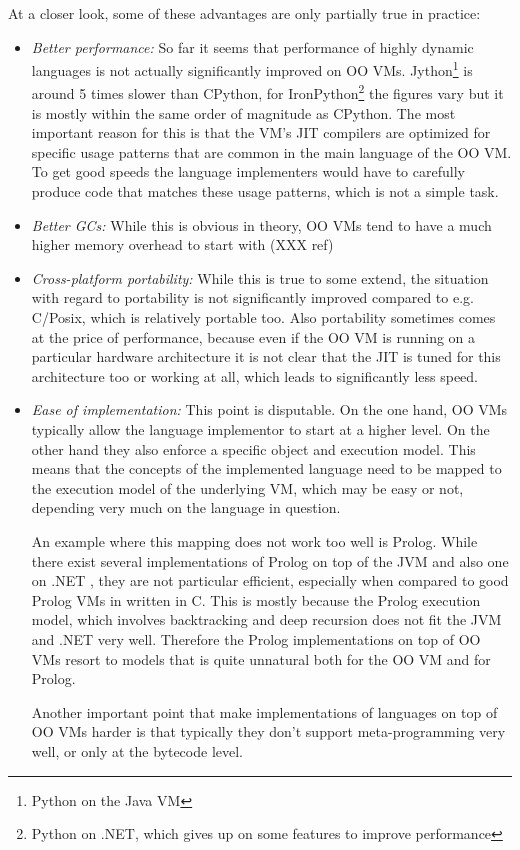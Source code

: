 \documentclass[utf8x]{llncs}
\begin{document}
At a closer look, some of these advantages are only partially true in practice:

\begin{itemize}
\item
\emph{Better performance:} So far it seems that performance of highly dynamic
languages is not actually significantly improved on OO VMs. 
Jython\footnote{Python on the Java VM} is around 5
times slower than CPython, for IronPython\footnote{Python on .NET, which
gives up on some features to improve performance}
the figures vary but it is mostly
within the same order of magnitude as CPython. The most important reason for
this is that the VM's JIT compilers are optimized for specific usage patterns
that are common in the main language of the OO VM. To get good speeds the
language implementers would have to carefully produce code that matches these
usage patterns, which is not a simple task.

\item
\emph{Better GCs:} While this is obvious in theory, OO VMs tend to have a much
higher memory overhead to start with (XXX ref)

\item
\emph{Cross-platform portability:} While this is true to some extend, the
situation with regard to portability is not significantly improved compared to
e.g.  C/Posix, which is relatively portable too. Also portability sometimes
comes at the price of performance, because even if the OO VM is running on a
particular hardware architecture it is not clear that the JIT is tuned for this
architecture too or working at all, which leads to significantly less
speed.

\item
\emph{Ease of implementation:} This point is disputable. On the one hand, OO
VMs typically allow the language implementor to start at a higher level. On the
other hand they also enforce a specific object and execution model. This means
that the concepts of the implemented language need to be mapped to the
execution model of the underlying VM, which may be easy or not, depending very
much on the language in question.

An example where this mapping does not work too well is Prolog. While there
exist several implementations of Prolog on top of the JVM \cite{prologcafe}
\cite{InterProlog} and also one on .NET \cite{psharp},
they are not particular efficient, especially when compared to good Prolog VMs
in written in C. This is mostly because the Prolog execution model, which
involves backtracking and deep recursion does not fit the JVM and .NET very
well. Therefore the Prolog implementations on top of OO VMs resort to models
that is quite unnatural both for the OO VM and for Prolog.

Another important point that make implementations of languages on top of OO VMs
harder is that typically they don't support meta-programming very well, or only
at the bytecode level.
\end{itemize}
\end{document}
